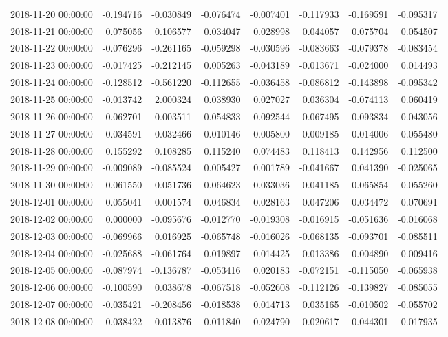 \begin{tabular}{lrrrrrrr}
2018-11-20 00:00:00 & -0.194716 & -0.030849 & -0.076474 & -0.007401 & -0.117933 & -0.169591 & -0.095317 \\
2018-11-21 00:00:00 & 0.075056 & 0.106577 & 0.034047 & 0.028998 & 0.044057 & 0.075704 & 0.054507 \\
2018-11-22 00:00:00 & -0.076296 & -0.261165 & -0.059298 & -0.030596 & -0.083663 & -0.079378 & -0.083454 \\
2018-11-23 00:00:00 & -0.017425 & -0.212145 & 0.005263 & -0.043189 & -0.013671 & -0.024000 & 0.014493 \\
2018-11-24 00:00:00 & -0.128512 & -0.561220 & -0.112655 & -0.036458 & -0.086812 & -0.143898 & -0.095342 \\
2018-11-25 00:00:00 & -0.013742 & 2.000324 & 0.038930 & 0.027027 & 0.036304 & -0.074113 & 0.060419 \\
2018-11-26 00:00:00 & -0.062701 & -0.003511 & -0.054833 & -0.092544 & -0.067495 & 0.093834 & -0.043056 \\
2018-11-27 00:00:00 & 0.034591 & -0.032466 & 0.010146 & 0.005800 & 0.009185 & 0.014006 & 0.055480 \\
2018-11-28 00:00:00 & 0.155292 & 0.108285 & 0.115240 & 0.074483 & 0.118413 & 0.142956 & 0.112500 \\
2018-11-29 00:00:00 & -0.009089 & -0.085524 & 0.005427 & 0.001789 & -0.041667 & 0.041390 & -0.025065 \\
2018-11-30 00:00:00 & -0.061550 & -0.051736 & -0.064623 & -0.033036 & -0.041185 & -0.065854 & -0.055260 \\
2018-12-01 00:00:00 & 0.055041 & 0.001574 & 0.046834 & 0.028163 & 0.047206 & 0.034472 & 0.070691 \\
2018-12-02 00:00:00 & 0.000000 & -0.095676 & -0.012770 & -0.019308 & -0.016915 & -0.051636 & -0.016068 \\
2018-12-03 00:00:00 & -0.069966 & 0.016925 & -0.065748 & -0.016026 & -0.068135 & -0.093701 & -0.085511 \\
2018-12-04 00:00:00 & -0.025688 & -0.061764 & 0.019897 & 0.014425 & 0.013386 & 0.004890 & 0.009416 \\
2018-12-05 00:00:00 & -0.087974 & -0.136787 & -0.053416 & 0.020183 & -0.072151 & -0.115050 & -0.065938 \\
2018-12-06 00:00:00 & -0.100590 & 0.038678 & -0.067518 & -0.052608 & -0.112126 & -0.139827 & -0.085055 \\
2018-12-07 00:00:00 & -0.035421 & -0.208456 & -0.018538 & 0.014713 & 0.035165 & -0.010502 & -0.055702 \\
2018-12-08 00:00:00 & 0.038422 & -0.013876 & 0.011840 & -0.024790 & -0.020617 & 0.044301 & -0.017935 \\

\end{tabular}
